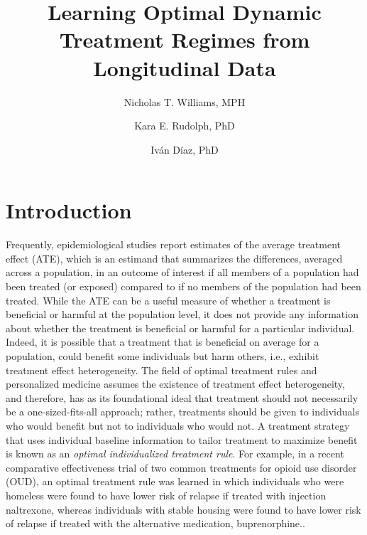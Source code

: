 \documentclass[11pt]{article}
\title{Learning Optimal Dynamic Treatment Regimes from Longitudinal Data}
\author[1]{Nicholas T. Williams, MPH}
\author[1]{Kara E. Rudolph, PhD}
\author[2]{Iv\'an D\'iaz, PhD}
\affil[1]{\footnotesize Department of Epidemiology, Mailman School of Public Health, Columbia University, New York, New York}
\affil[2]{\footnotesize Division of Biostatistics, Department of Population
  Health Sciences, Weill Cornell Medicine, New York, New York}
\date{}
\begin{document}
 

\maketitle

\begin{abstract}

\end{abstract}

\section{Introduction}

Frequently, epidemiological studies report estimates of the %
average treatment effect (ATE), which is an %
estimand that summarizes the differences, averaged across a population, in an outcome of interest if all members of a population had been treated (or exposed) compared to if no members of the population had been treated. %
While the ATE can be a useful measure of %
whether a treatment %
is beneficial or harmful at the population level, it does not provide any information about whether the treatment %
is beneficial or harmful for a particular %
individual. Indeed, it is possible that a treatment %
that is beneficial on average for a population, could benefit some individuals but harm others, i.e., exhibit treatment effect heterogeneity. The field of optimal treatment rules and personalized medicine assumes the existence of treatment effect heterogeneity, and therefore, has as its foundational ideal that %
treatment should not necessarily be a one-sized-fits-all approach; rather, treatments should be given to individuals who would benefit but not to individuals who would not.\cite{} A treatment strategy that uses individual baseline information %
to tailor treatment to maximize benefit is known as an \textit{optimal individualized treatment rule}.\cite{} %
For example, in a recent comparative effectiveness trial of two common treatments for opioid use disorder (OUD), an optimal treatment rule was learned in which individuals who were homeless were found to have lower risk of relapse if treated with injection naltrexone, whereas individuals with stable housing were found to have lower risk of relapse if treated with the alternative medication, buprenorphine.\cite{rudolph2021optimizing}. 
\end{document}

